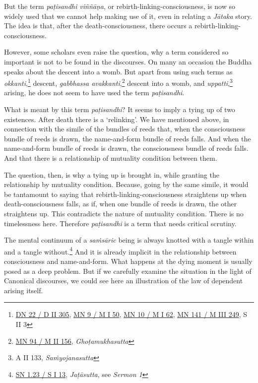 But the term \emph{paṭisandhi viññāṇa}, or rebirth-linking-consciousness, is now so widely used that we cannot help making use of it, even in relating a \emph{Jātaka} story. The idea is that, after the death-consciousness, there occurs a rebirth-linking-consciousness.

However, some scholars even raise the question, why a term considered so important is not to be found in the discourses. On many an occasion the Buddha speaks about the descent into a womb. But apart from using such terms as \emph{okkanti},\footnote{\href{https://suttacentral.net/dn22/pli/ms}{DN 22 / D II 305}, \href{https://suttacentral.net/mn9/pli/ms}{MN 9 / M I 50}, \href{https://suttacentral.net/mn10/pli/ms}{MN 10 / M I 62}, \href{https://suttacentral.net/mn141/pli/ms}{MN 141 / M III 249}, S II 3} descent, \emph{gabbhassa avakkanti},\footnote{\href{https://suttacentral.net/mn94/pli/ms}{MN 94 / M II 156}, \emph{Ghoṭamukhasutta}} descent into a womb, and \emph{uppatti},\footnote{A II 133, \emph{Saṁyojanasutta}} arising, he does not seem to have used the term \emph{paṭisandhi}.

What is meant by this term \emph{paṭisandhi}? It seems to imply a tying up of two existences. After death there is a `relinking'. We have mentioned above, in connection with the simile of the bundles of reeds that, when the consciousness bundle of reeds is drawn, the name-and-form bundle of reeds falls. And when the name-and-form bundle of reeds is drawn, the consciousness bundle of reeds falls. And that there is a relationship of mutuality condition between them.

The question, then, is why a tying up is brought in, while granting the relationship by mutuality condition. Because, going by the same simile, it would be tantamount to saying that rebirth-linking-consciousness straightens up when death-consciousness falls, as if, when one bundle of reeds is drawn, the other straightens up. This contradicts the nature of mutuality condition. There is no timelessness here. Therefore \emph{paṭisandhi} is a term that needs critical scrutiny.

The mental continuum of a \emph{saṁsāric} being is always knotted with a tangle within and a tangle without.\footnote{\href{https://suttacentral.net/sn1.23/pli/ms}{SN 1.23 / S I 13}, \emph{Jaṭāsutta}, see \emph{Sermon 1}} And it is already implicit in the relationship between consciousness and name-and-form. What happens at the dying moment is usually posed as a deep problem. But if we carefully examine the situation in the light of Canonical discourses, we could see here an illustration of the law of dependent arising itself.


